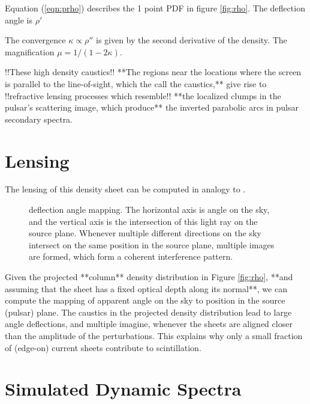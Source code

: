 \documentclass[useAMS,usenatbib]{mn2e}
\begin{document}
Equation (\ref{eqn:prho}) describes the 1 point PDF in figure
\ref{fig:rho}.  The deflection angle is $\rho'$

The convergence $\kappa \propto \rho''$ is given by
the second derivative of the density.  The magnification
$\mu=1/(1-2\kappa)$.

!!These high density caustics!! **The regions near the locations where the screen is parallel
to the line-of-sight, which the call the caustics,** give rise to !!refractive lensing processes
which resemble!! **the localized clumps in the pulsar's scattering image, which
produce** the inverted parabolic arcs in pulsar secondary
spectra.

\section{Lensing}

The lensing of this density sheet can be computed in analogy to 
 \cite{2012MNRAS.421L.132P}.

\begin{figure}
\centerline{}
\caption{deflection angle mapping. The horizontal axis is angle on the
sky, and the vertical axis is the intersection of this light ray on
the source plane.  Whenever multiple different directions on the sky
intersect on the same position in the source plane, multiple images
are formed, which form a coherent interference pattern.}
\label{fig:dt}
\end{figure}

Given the projected **column** density distribution in Figure \ref{fig:rho}, **and assuming that
the sheet has a fixed optical depth along its normal**, we
can compute the mapping of apparent angle on the sky to position in the
source (pulsar) plane.  The caustics in the projected density
distribution lead to large angle deflections, and multiple imagine,
whenever the sheets are aligned closer than the amplitude of the
perturbations.  This explains why only a small fraction of (edge-on) current
sheets contribute to scintillation.

\section{Simulated Dynamic Spectra}
\end{document}
